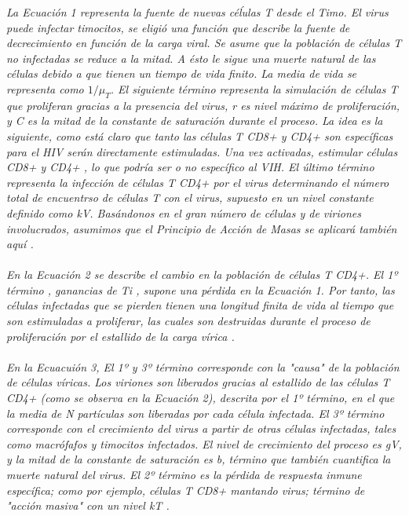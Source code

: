 \documentclass[a4paper,twocolumn,10pt]{article}
\begin{document}
\itshape La Ecuación 1 representa la fuente de nuevas céĺulas T desde el Timo.  El virus puede infectar timocitos, se eligió una función que describe la fuente de decrecimiento en función de la carga viral. Se asume que la población de células T no infectadas se reduce a la mitad. A ésto le sigue una muerte natural de las células debido a que tienen un tiempo de vida finito. La media de vida se representa como $1/\mu_T$. El siguiente término representa la simulación de células T que proliferan gracias a la presencia del virus, r es nivel máximo de proliferación, y C es la mitad  de la constante de saturación durante el proceso. La idea es la siguiente, como está claro que tanto las células T CD8+ y CD4+ son específicas para el HIV serán directamente estimuladas. Una vez activadas, estimular células CD8+ y CD4+ , lo que podría ser o no específico al VIH. El último término representa la infección de células T CD4+ por el virus determinando el número total de encuentrso de células T con el virus, supuesto en un nivel constante definido como kV. 
Basándonos en el gran número de células y de viriones involucrados, asumimos que el Principio de Acción de Masas se aplicará también aquí \cite{Kirschner1996}.\\ \\
En la Ecuación 2 se describe el cambio en la población de células T CD4+. El 1º término , ganancias de Ti , supone una pérdida en la Ecuación 1. Por tanto, las células infectadas que se pierden tienen una longitud finita de vida al tiempo  que son estimuladas a proliferar, las cuales son destruidas durante el proceso de proliferación por el estallido de la carga vírica \cite{Kirschner1996}. \\ \\
En la Ecuacuión 3, El 1º y 3º término corresponde con la "causa" de la población de células víricas. Los viriones son liberados gracias al estallido de las células T CD4+ (como se observa en la Ecuación 2), descrita por el 1º término, en el que la media de N partículas son liberadas por cada célula infectada. El 3º término corresponde con el crecimiento del virus a partir de otras células infectadas, tales como macrófafos y timocitos infectados. El nivel de crecimiento del proceso es gV, y la mitad de la constante de saturación es b, término que también cuantifica la muerte natural del virus. El 2º término es la pérdida de respuesta inmune específica; como por ejemplo, células T CD8+ mantando virus; término de "acción masiva" con un nivel kT \cite{Kirschner1996}.
\end{document}

